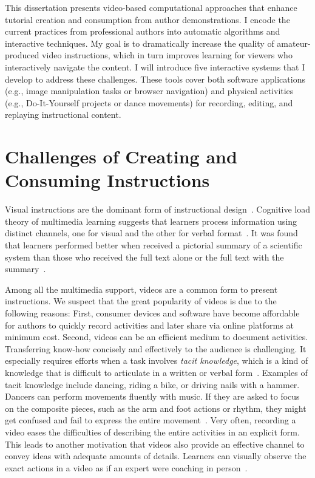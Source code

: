 This dissertation presents video-based computational approaches that enhance tutorial creation and consumption from author demonstrations.
I encode the current practices from professional authors into automatic algorithms and interactive techniques.
My goal is to dramatically increase the quality of amateur-produced video instructions, which in turn improves learning for viewers who interactively navigate the content.
%
I will introduce five interactive systems that I develop to address these challenges. These tools cover both software applications (e.g., image manipulation tasks or browser navigation) and physical activities (e.g., Do-It-Yourself projects or dance movements) for recording, editing, and replaying instructional content.


\section{Challenges of Creating and Consuming Instructions}

Visual instructions are the dominant form of instructional design~\cite{mijksenaar1999open}. Cognitive load theory of multimedia learning suggests that learners process information using distinct channels, one for visual and the other for verbal format~\cite{sweller1998cognitive,sweller1988cognitive,paas2003cognitive}. It was found that learners performed better when received a pictorial summary of a scientific system than those who received the full text alone or the full text with the summary~\cite{mayer1996less}.

Among all the multimedia support, videos are a common form to present instructions. We suspect that the great popularity of videos is due to the following reasons:
%
First, consumer devices and software have become affordable for authors to quickly record activities and later share via online platforms at minimum cost.
%
Second, videos can be an efficient medium to document activities. Transferring know-how concisely and effectively to the audience is challenging. It especially requires efforts when a task involves \emph{tacit knowledge}, which is a kind of knowledge that is difficult to articulate in a written or verbal form~\cite{polanyi1958personal, Klemmer:2006:BMF:1142405.1142429}. Examples of tacit knowledge include dancing, riding a bike, or driving nails with a hammer. Dancers can perform movements fluently with music. If they are asked to focus on the composite pieces, such as the arm and foot actions or rhythm, they might get confused and fail to express the entire movement~\cite{polanyi1958personal}. Very often, recording a video eases the difficulties of describing the entire activities in an explicit form.
%
This leads to another motivation that videos also provide an effective channel to convey ideas with adequate amounts of details. Learners can visually observe the exact actions in a video as if an expert were coaching in person~\cite{Kuznetsov:2010:REA:1868914.1868950}.

